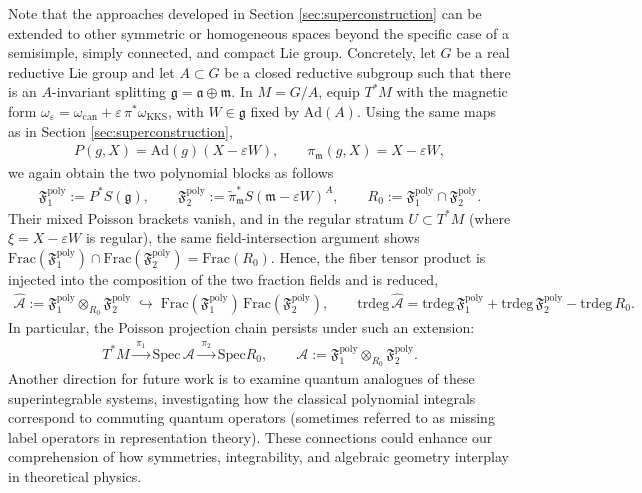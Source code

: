 \documentclass[11pt]{amsart}
\theoremstyle{definition}
\theoremstyle{plain}
\theoremstyle{conclusion}
\begin{document}
Note that the approaches developed in Section \ref{sec:superconstruction} can be extended to other symmetric or homogeneous spaces beyond the specific case of a semisimple, simply connected, and compact Lie group. Concretely, let $G$ be a real reductive Lie group and let $A\subset G$ be a closed reductive subgroup such that there is an $A$-invariant splitting $\mathfrak{g}=\mathfrak{a}\oplus\mathfrak{m}$. In $M=G/A$, equip $T^*M$ with the magnetic form $\omega_\varepsilon=\omega_{\mathrm{can}}+\varepsilon\,\pi^*\omega_{\mathrm{KKS}}$, with $W \in \mathfrak{g}$ fixed by $\mathrm{Ad}(A)$. Using the same maps as in Section \ref{sec:superconstruction}, \begin{align*}
   P(g,X)=\mathrm{Ad}(g)(X-\varepsilon W),\qquad \pi_\mathfrak{m}(g,X)=X-\varepsilon W, 
\end{align*} we again obtain the two polynomial blocks as follows
\begin{align*}
\mathfrak{F}_1^{\mathrm{poly}} := P^*S(\mathfrak{g}),\qquad  \mathfrak{F}_2^{\mathrm{poly}}:= \widetilde{\pi}_\mathfrak{m}^*S(\mathfrak{m}-\varepsilon W)^A,\qquad
R_0:=\mathfrak{F}_1^{\mathrm{poly}}\cap \mathfrak{F}_2^{\mathrm{poly}}.
\end{align*} Their mixed Poisson brackets vanish, and in the regular stratum $U\subset T^*M$ (where $\xi=X-\varepsilon W$ is regular), the same field-intersection argument shows  $\mathrm{Frac}(\mathfrak{F}_1^{\mathrm{poly}})\cap \mathrm{Frac}(\mathfrak{F}_2^{\mathrm{poly}})=\mathrm{Frac}(R_0)$. Hence, the fiber tensor product is injected into the composition of the two fraction fields and is reduced,
\begin{align*}
\widehat{\mathcal{A}}:=\mathfrak{F}_1^{\mathrm{poly}}\otimes_{R_0}\mathfrak{F}_2^{\mathrm{poly}}\;\hookrightarrow\; \mathrm{Frac}(\mathfrak{F}_1^{\mathrm{poly}})\,\mathrm{Frac}(\mathfrak{F}_2^{\mathrm{poly}}),\qquad  \mathrm{trdeg} \, \widehat{\mathcal{A}}=\mathrm{trdeg} \, \mathfrak{F}_1^{\mathrm{poly}}+\mathrm{trdeg}\,\mathfrak{F}_2^{\mathrm{poly}}-\mathrm{trdeg} \, R_0.
\end{align*} In particular, the Poisson projection chain persists under such an extension:
\begin{align*}
T^*M \xrightarrow{\;\pi_1\;} \mathrm{Spec}\, \mathcal{A} \xrightarrow{\;\pi_2\;} \mathrm{Spec}R_0,\qquad  \mathcal{A}:=\mathfrak{F}_1^{\mathrm{poly}}\otimes_{R_0}\mathfrak{F}_2^{\mathrm{poly}}.
\end{align*}
 Another direction for future work is to examine quantum analogues of these superintegrable systems, investigating how the classical polynomial integrals correspond to commuting quantum operators (sometimes referred to as missing label operators in representation theory). These connections could enhance our comprehension of how symmetries, integrability, and algebraic geometry interplay in theoretical physics. 
 
\end{document}
